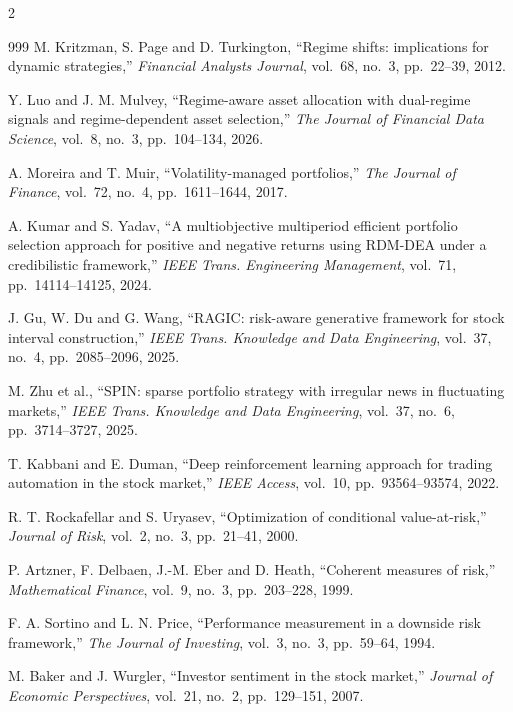 \begin{footnotesize}
\begin{multicols}{2}
\begin{thebibliography}{999}
 M. Kritzman, S. Page and D. Turkington, ``Regime shifts: implications for
dynamic strategies,'' \emph{Financial Analysts Journal}, vol.~68, no.~3, pp.~22--39, 2012.

 Y. Luo and J. M. Mulvey, ``Regime-aware asset allocation with dual-regime
signals and regime-dependent asset selection,'' \emph{The Journal of Financial Data Science},
vol.~8, no.~3, pp.~104--134, 2026.

 A. Moreira and T. Muir, ``Volatility-managed portfolios,'' \emph{The Journal
of Finance}, vol.~72, no.~4, pp.~1611--1644, 2017.

 A. Kumar and S. Yadav, ``A multiobjective multiperiod efficient portfolio
selection approach for positive and negative returns using RDM-DEA under a credibilistic
framework,'' \emph{IEEE Trans. Engineering Management}, vol.~71, pp.~14114--14125, 2024.

 J. Gu, W. Du and G. Wang, ``RAGIC: risk-aware generative framework for stock
interval construction,'' \emph{IEEE Trans. Knowledge and Data Engineering}, vol.~37, no.~4,
pp.~2085--2096, 2025.

 M. Zhu et al., ``SPIN: sparse portfolio strategy with irregular news in
fluctuating markets,'' \emph{IEEE Trans. Knowledge and Data Engineering}, vol.~37, no.~6,
pp.~3714--3727, 2025.

 T. Kabbani and E. Duman, ``Deep reinforcement learning approach for
trading automation in the stock market,'' \emph{IEEE Access}, vol.~10, pp.~93564--93574, 2022.

 R. T. Rockafellar and S. Uryasev, ``Optimization of conditional
value-at-risk,'' \emph{Journal of Risk}, vol.~2, no.~3, pp.~21--41, 2000.

 P. Artzner, F. Delbaen, J.-M. Eber and D. Heath, ``Coherent measures of
risk,'' \emph{Mathematical Finance}, vol.~9, no.~3, pp.~203--228, 1999.

 F. A. Sortino and L. N. Price, ``Performance measurement in a downside risk
framework,'' \emph{The Journal of Investing}, vol.~3, no.~3, pp.~59--64, 1994.

 M. Baker and J. Wurgler, ``Investor sentiment in the stock market,''
\emph{Journal of Economic Perspectives}, vol.~21, no.~2, pp.~129--151, 2007.


\end{thebibliography}
\end{multicols}
\end{footnotesize}
